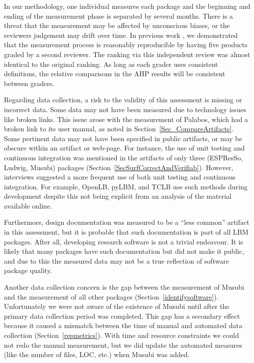 \documentclass[final, 3p, times, authoryear]{elsarticle}
\begin{document}
In our methodology, one individual measures each package and the beginning and
ending of the measurement phase is separated by several months.  There is a
threat that the measurement may be affected by unconscious biases, or the
reviewers judgement may drift over time.  In previous work
\citep{SmithEtAl2016}, we demonstrated that the measurement process is
reasonably reproducible by having five products graded by a second reviewer. The
ranking via this independent review was almost identical to the original
ranking. As long as each grader uses consistent definitions, the relative
comparisons in the AHP results will be consistent between graders.

Regarding data collection, a risk to the validity of this assessment is missing
or incorrect data. Some data may not have been measured due to technology issues
like broken links. This issue arose with the measurement of Palabos, which had a
broken link to its user manual, as noted in Section~\ref{Sec_CompareArtifacts}.
Some pertinent data may not have been specified in public artifacts, or may be
obscure within an artifact or web-page. For instance, the use of unit testing
and continuous integration was mentioned in the artifacts of only three
(ESPResSo, Ludwig, Musubi) packages (Section~\ref{SecSurfCorrectAndVerifiab}).
However, interviews suggested a more frequent use of both unit testing and
continuous integration. For example, OpenLB, pyLBM, and TCLB use such methods
during development despite this not being explicit from an analysis of the
material available online. 

Furthermore, design documentation was measured to be a ``less common'' artifact
in this assessment, but it is probable that such documentation is part of all
LBM packages. After all, developing research software is not a trivial
endeavour. It is likely that many packages have such documentation but did not
make it public, and due to this the measured data may not be a true reflection
of software package quality.

Another data collection concern is the gap between the measurement of Musubi and
the measurement of all other packages (Section~\ref{identifysoftware}).
Unfortunately we were not aware of the existence of Musubi until after the
primary data collection period was completed. This gap has a secondary effect
because it caused a mismatch between the time of manual and automated data
collection (Section~\ref{repmetrics}).  With time and resource constraints we
could not redo the manual measurement, but we did update the automated measures
(like the number of files, LOC, etc.) when Musubi was added.
\end{document}
